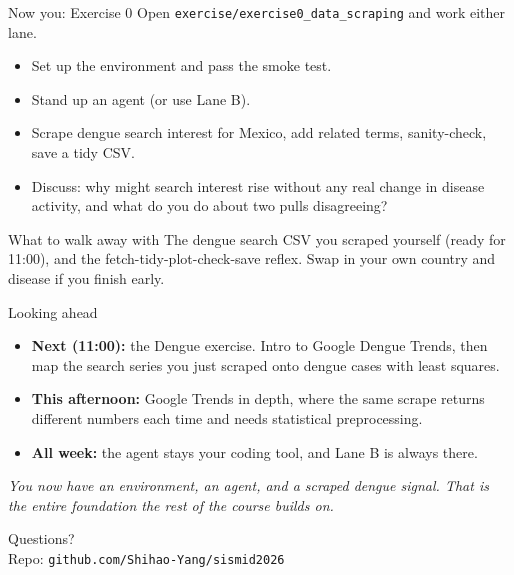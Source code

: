 \documentclass[aspectratio=169,11pt]{beamer}
\begin{document}
\begin{frame}{Now you: Exercise 0}
  Open \texttt{exercise/exercise0\_data\_scraping} and work either lane.
  \begin{itemize}
    \item Set up the environment and pass the smoke test.
    \item Stand up an agent (or use Lane B).
    \item Scrape dengue search interest for Mexico, add related terms, sanity-check, save
          a tidy CSV.
    \item Discuss: why might search interest rise without any real change in disease
          activity, and what do you do about two pulls disagreeing?
  \end{itemize}
  \vspace{0.4em}
  \begin{block}{What to walk away with}
    The dengue search CSV you scraped yourself (ready for 11:00), and the
    fetch-tidy-plot-check-save reflex. Swap in your own country and disease if you finish
    early.
  \end{block}
\end{frame}

\begin{frame}{Looking ahead}
  \begin{itemize}
    \item \textbf{Next (11:00):} the Dengue exercise. Intro to Google Dengue Trends, then
          map the search series you just scraped onto dengue cases with least squares.
    \item \textbf{This afternoon:} Google Trends in depth, where the same scrape returns
          different numbers each time and needs statistical preprocessing.
    \item \textbf{All week:} the agent stays your coding tool, and Lane B is always there.
  \end{itemize}
  \vfill
  \begin{center}
    \itshape You now have an environment, an agent, and a scraped dengue signal. That is
    the entire foundation the rest of the course builds on.
  \end{center}
\end{frame}

\begin{frame}[standout]
  Questions?\\[0.4em]
  \small Repo: \texttt{github.com/Shihao-Yang/sismid2026}
\end{frame}
\end{document}

